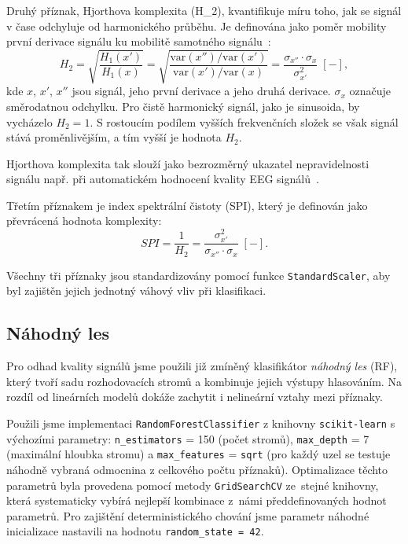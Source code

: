 Druhý příznak, Hjorthova komplexita (\acs{H_2}), kvantifikuje míru toho, jak se signál v čase odchyluje od harmonického průběhu.
Je definována jako poměr mobility první derivace signálu ku mobilitě samotného signálu~\cite{Hjorth1970,Geetika2022}:
\begin{equation}
	\label{eq:hjorth_complexity}
	H_{2} = \sqrt{ \frac{H_1(x')}{H_1(x)} }
	= \sqrt{ \frac{ \text{var}(x'') / \text{var}(x') }{ \text{var}(x') / \text{var}(x) } }
	= \frac{ \sigma_{x''} \cdot \sigma_{x} }{ \sigma_{x'}^2 } \; [-],
\end{equation}
kde $x$, $x'$, $x''$ jsou signál, jeho první derivace a jeho druhá derivace.
$\sigma_x$ označuje směrodatnou odchylku.
Pro čistě harmonický signál, jako je sinusoida, by vycházelo $H_2 = 1$.
S rostoucím podílem vyšších frekvenčních složek se však signál stává proměnlivějším, a tím vyšší je hodnota \( H_2 \).

Hjorthova komplexita tak slouží jako bezrozměrný ukazatel nepravidelnosti signálu např. při automatickém hodnocení kvality EEG signálů~\cite{Geetika2022}.

Třetím příznakem je index spektrální čistoty (\acs{SPI}), který je definován jako převrácená hodnota komplexity:
\begin{equation}
	\label{eq:hjorth_SPI}
	SPI = \frac{1}{H_2} = \frac{\sigma_{x'}^2}{\sigma_{x''} \cdot \sigma_{x}} \; [-].
\end{equation}

Všechny tři příznaky jsou standardizovány pomocí funkce \texttt{StandardScaler}, aby byl zajištěn jejich jednotný váhový vliv při klasifikaci.

\subsection*{Náhodný les}
\label{subsec:random_forest}
Pro odhad kvality signálů jsme použili již zmíněný klasifikátor \emph{náhodný les} (\acs{RF}), který tvoří sadu rozhodovacích stromů a kombinuje jejich výstupy hlasováním.
Na rozdíl od lineárních modelů dokáže zachytit i nelineární vztahy mezi příznaky.

Použili jsme implementaci \texttt{RandomForestClassifier} z knihovny \texttt{scikit-learn} s výchozími parametry: \texttt{n\_estimators} = 150 (počet stromů), \texttt{max\_depth} = 7 (maximální hloubka stromu) a \texttt{max\_features} = \texttt{sqrt} (pro každý uzel se testuje náhodně vybraná odmocnina z celkového počtu příznaků).
Optimalizace těchto parametrů byla provedena pomocí metody \texttt{GridSearchCV} ze~stejné knihovny, která systematicky vybírá nejlepší kombinace z~námi předdefinovaných hodnot parametrů.
Pro zajištění deterministického chování jsme parametr náhodné inicializace nastavili na hodnotu \texttt{random\_state = 42}.

